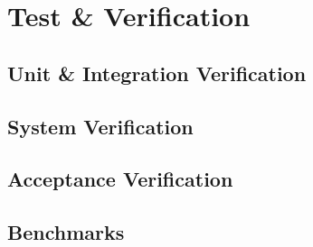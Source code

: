 \chapter{Test \& Verification}
\section{Unit \& Integration Verification}
\section{System Verification}
\section{Acceptance Verification}
\section{Benchmarks}